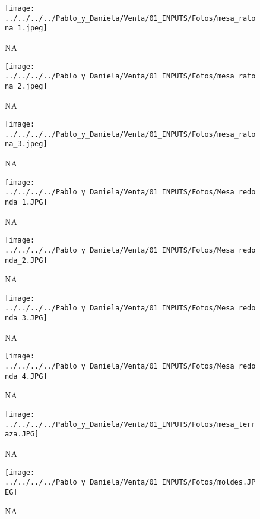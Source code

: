 \documentclass[
]{article}
\begin{document}
\pagebreak

\begin{figure}
\centering
\texttt{[image: ../../../../Pablo\_y\_Daniela/Venta/01\_INPUTS/Fotos/mesa\_ratona\_1.jpeg]}
\caption{NA}
\end{figure}

\pagebreak

\begin{figure}
\centering
\texttt{[image: ../../../../Pablo\_y\_Daniela/Venta/01\_INPUTS/Fotos/mesa\_ratona\_2.jpeg]}
\caption{NA}
\end{figure}

\pagebreak

\begin{figure}
\centering
\texttt{[image: ../../../../Pablo\_y\_Daniela/Venta/01\_INPUTS/Fotos/mesa\_ratona\_3.jpeg]}
\caption{NA}
\end{figure}

\pagebreak

\begin{figure}
\centering
\texttt{[image: ../../../../Pablo\_y\_Daniela/Venta/01\_INPUTS/Fotos/Mesa\_redonda\_1.JPG]}
\caption{NA}
\end{figure}

\pagebreak

\begin{figure}
\centering
\texttt{[image: ../../../../Pablo\_y\_Daniela/Venta/01\_INPUTS/Fotos/Mesa\_redonda\_2.JPG]}
\caption{NA}
\end{figure}

\pagebreak

\begin{figure}
\centering
\texttt{[image: ../../../../Pablo\_y\_Daniela/Venta/01\_INPUTS/Fotos/Mesa\_redonda\_3.JPG]}
\caption{NA}
\end{figure}

\pagebreak

\begin{figure}
\centering
\texttt{[image: ../../../../Pablo\_y\_Daniela/Venta/01\_INPUTS/Fotos/Mesa\_redonda\_4.JPG]}
\caption{NA}
\end{figure}

\pagebreak

\begin{figure}
\centering
\texttt{[image: ../../../../Pablo\_y\_Daniela/Venta/01\_INPUTS/Fotos/mesa\_terraza.JPG]}
\caption{NA}
\end{figure}

\pagebreak

\begin{figure}
\centering
\texttt{[image: ../../../../Pablo\_y\_Daniela/Venta/01\_INPUTS/Fotos/moldes.JPEG]}
\caption{NA}
\end{figure}
\end{document}

